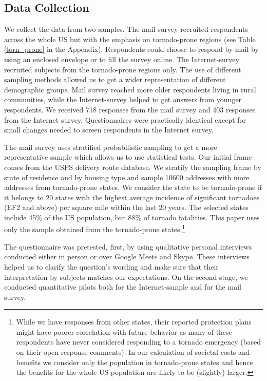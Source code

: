 \documentclass{ametsocV6.1}
\begin{document}
\subsection{Data Collection} 
We collect the data from two samples. The mail survey recruited respondents across the whole US but with the emphasis on tornado-prone regions (see Table \ref{torn_prone} in the Appendix). Respondents could choose to respond by mail by using an enclosed envelope or to fill the survey online. The Internet-survey recruited subjects from the tornado-prone regions only. The use of different sampling methods allowed us to get a wider representation of different demographic groups. Mail survey reached more older respondents living in rural communities, while the Internet-survey helped to get answers from younger respondents. We received 718 responses from the mail survey and 403 responses from the Internet survey. Questionnaires were practically identical  except for small changes needed to screen respondents in the Internet survey. 

The mail survey uses stratified probabilistic sampling to get a more representative sample which allows us to use statistical tests. Our initial frame comes from the USPS delivery route database. We stratify the sampling frame by state of residence and by housing type and sample 10600 addresses with more addresses from tornado-prone states. We consider the state to be tornado-prone if it belongs to 20 states with the highest average incidence of significant tornadoes (EF2 and above) per square mile within the last 20 years.  The selected states include 45\% of the US population, but 88\% of tornado fatalities. This paper uses only the sample obtained from the tornado-prone states.\footnote{While we have responses from other states, their reported protection plans might have poorer correlation with future behavior as many of these respondents have never considered responding to a tornado emergency (based on their open response comments). In our calculation of societal costs and benefits we consider only the population in tornado-prone states and hence the benefits for the whole US population are likely to be (slightly) larger.}

The questionnaire was pretested, first, by using qualitative personal  interviews conducted either in person or over Google Meets and Skype. These interviews helped us to clarify the question's wording and make sure that their interpretation by subjects matches our expectations. On the second stage, we conducted quantitative pilots both for the Internet-sample and for the mail survey.
\end{document}
